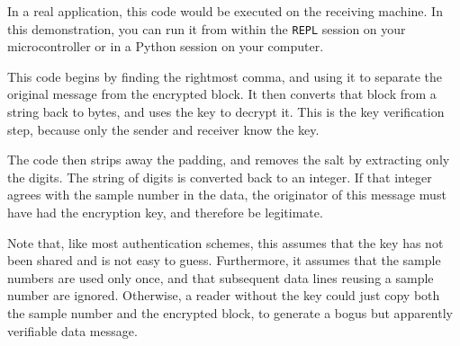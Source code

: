 \begin{enumerate}
	In a real application, this code would be executed on the receiving machine.
	In this demonstration, you can run it from within the \texttt{REPL} session on your microcontroller or in a Python session on your computer.

	\smallskip
	This code begins by finding the rightmost comma, and using it to separate the original message from the encrypted block.
	It then converts that block from a string back to bytes, and uses the key to decrypt it.
	This is the key verification step, because only the sender and receiver know the key.

	\smallskip
	The code then strips away the padding, and removes the salt by extracting only the digits.
	The string of digits is converted back to an integer.
	If that integer agrees with the sample number in the data, the originator of this message must have had the encryption key, and therefore be legitimate.

	\smallskip
	Note that, like most authentication schemes, this assumes that the key has not been shared and is not easy to guess.
	Furthermore, it assumes that the sample numbers are used only once, and that subsequent data lines reusing a sample number are ignored.
	Otherwise, a reader without the key could just copy both the sample number and the encrypted block, to generate a bogus but apparently verifiable data message.

\end{enumerate}
